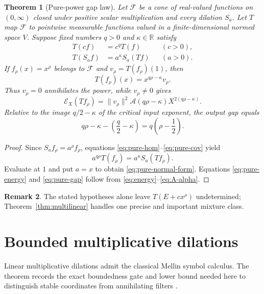 \documentclass[11pt,a4paper]{amsart}
\newtheorem{theorem}{Theorem}[section]
\theoremstyle{definition}
\newtheorem{remark}[theorem]{Remark}
\newcommand{\R}{\mathbb R}
\newcommand{\norm}[1]{\lVert #1\rVert}
\newcommand{\cE}{\mathcal E}
\newcommand{\cA}{\mathcal A}
\begin{document}
\begin{theorem}[Pure-power gap law]\label{thm:pure}
Let $\mathcal F$ be a cone of real-valued functions on $(0,\infty)$ closed under positive scalar multiplication and every dilation $S_a$.  Let $T$ map $\mathcal F$ to pointwise measurable functions valued in a finite-dimensional normed space $V$.  Suppose fixed numbers $q>0$ and $\kappa\in\R$ satisfy
\begin{align}
 T(cf)&=c^qT(f)&& (c>0),\label{eq:pure-hom}\\
 T(S_af)&=a^\kappa S_a(Tf)&& (a>0).\label{eq:pure-cov}
\end{align}
If $f_\rho(x)=x^\rho$ belongs to $\mathcal F$ and
$v_\rho=T(f_\rho)(1)$, then
\begin{equation}\label{eq:pure-normal-form}
 T(f_\rho)(x)=x^{q\rho-\kappa}v_\rho.
\end{equation}
Thus $v_\rho=0$ annihilates the power, while $v_\rho\ne0$ gives
\begin{equation}\label{eq:pure-energy}
 \cE_X(Tf_\rho)
 =\norm{v_\rho}^2\cA(q\rho-\kappa)
 X^{2(q\rho-\kappa)}.
\end{equation}
Relative to the image $q/2-\kappa$ of the critical input exponent, the output gap equals
\begin{equation}\label{eq:pure-gap}
 q\rho-\kappa-\left(\frac q2-\kappa\right)
 =q\left(\rho-\frac12\right).
\end{equation}
\end{theorem}

\begin{proof}
Since $S_af_\rho=a^\rho f_\rho$, equations
\eqref{eq:pure-hom}--\eqref{eq:pure-cov} yield
\[
 a^{q\rho}T(f_\rho)=a^\kappa S_a(Tf_\rho).
\]
Evaluate at $1$ and put $a=x$ to obtain \eqref{eq:pure-normal-form}.  Equations \eqref{eq:pure-energy} and \eqref{eq:pure-gap} follow from \eqref{eq:energy}--\eqref{eq:A-alpha}.
\end{proof}

\begin{remark}
The stated hypotheses alone leave $T(E+cx^\rho)$ undetermined; Theorem~\ref{thm:multilinear} handles one precise and important mixture class.
\end{remark}

\section{Bounded multiplicative dilations}\label{sec:Mellin}

Linear multiplicative dilations admit the classical Mellin symbol calculus.  The theorem records the exact boundedness gate and lower bound needed here to distinguish stable coordinates from annihilating filters \cite{Wiener1932,JacobsenEtAl2009,DamekEtAl2014}.
\end{document}

